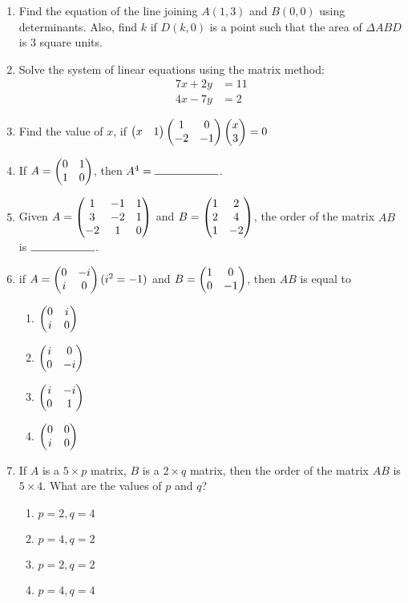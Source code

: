 \documentclass{article}
\begin{document}
\begin{enumerate}
    \item Find the equation of the line joining $A(1, 3)$ and $B(0, 0)$ using determinants. Also, find $k$ if $D(k, 0)$ is a point such that the area of $\Delta{ABD}$ is $3$ square units.
    
    \item Solve the system of linear equations using the matrix method:
    \begin{align*}
        7x + 2y &= 11 \\
        4x - 7y &= 2
    \end{align*}
    
    \item Find the value of $x$, if
    $\begin{pmatrix}x & 1\end{pmatrix}
    \begin{pmatrix}1 & 0 \\ -2 & -1\end{pmatrix}
    \begin{pmatrix}x \\ 3\end{pmatrix} = 0$
    
    \item If $A = \begin{pmatrix}0 & 1 \\ 1 & 0\end{pmatrix}$, then $A^4 = \rule{2cm}{0.15mm}$.

    \item Given $A = \begin{pmatrix}1 & -1 & 1 \\ 3 & -2 & 1 \\ -2 & 1 & 0\end{pmatrix}$ and
    $B = \begin{pmatrix}1 & 2 \\ 2 & 4 \\ 1 & -2\end{pmatrix}$, the order of the matrix $AB$ is $\rule{2cm}{0.15mm}$.
    
    \item if $A = \begin{pmatrix}0 & -i \\ i & 0\end{pmatrix} (i^2 = -1)$ and  $B = \begin{pmatrix}1 & 0 \\ 0 & -1\end{pmatrix}$, then $AB$ is equal to
    \begin{enumerate}
        \item $\begin{pmatrix}0 & i \\ i & 0\end{pmatrix}$
        \item $\begin{pmatrix}i & 0 \\ 0 & -i\end{pmatrix}$
        \item $\begin{pmatrix}i & -i \\ 0 & 1\end{pmatrix}$
        \item $\begin{pmatrix}0 & 0 \\ i & 0\end{pmatrix}$
    \end{enumerate}
   
   \item If $A$ is a $5 \times p$ matrix, $B$ is a $2 \times q$ matrix, then the order of the matrix $AB$ is $5 \times 4$. What are the values of $p$ and $q$?
   \begin{enumerate}
       \item $p = 2, q = 4$
       \item $p = 4, q = 2$
       \item $p = 2, q = 2$
       \item $p = 4, q = 4$
   \end{enumerate}


\end{enumerate}
\end{document}
